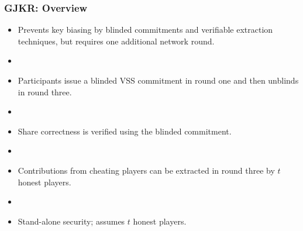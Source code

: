 \documentclass[hyperref={pdfpagelabels=true},table,dvipsnames,14pt,aspectratio=169]{beamer}
\begin{document}
\begin{frame}
  \frametitle{GJKR: Overview}

  \begin{itemize}
    \item Prevents key biasing by blinded commitments and verifiable extraction techniques,
      but requires one additional network round.
    \item[]
    \item<2-> Participants issue a blinded VSS commitment in round one and then unblinds in round three.
    \item[]
    \item<3-> Share correctness is verified using the blinded commitment.
    \item[]
    \item<4-> Contributions from cheating players can be extracted in round three by $t$ honest players.
    \item[]
    \item<5-> Stand-alone security; assumes $t$ honest players.
  \end{itemize}
\end{frame}
\end{document}

